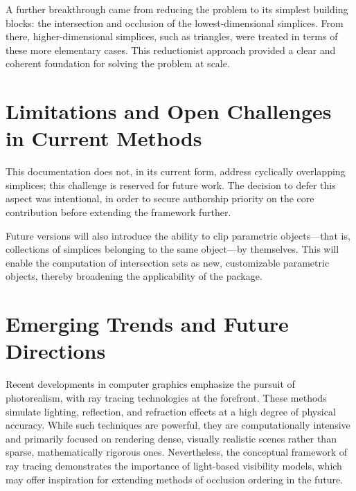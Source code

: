A further breakthrough came from reducing the problem to its 
simplest building blocks: the intersection and occlusion of the 
lowest-dimensional simplices. From there, higher-dimensional 
simplices, such as triangles, were treated in terms of these more 
elementary cases. This reductionist approach provided a clear and 
coherent foundation for solving the problem at scale.

\section{Limitations and Open Challenges in Current Methods}

This documentation does not, in its current form, address cyclically 
overlapping simplices; this challenge is reserved for future work. 
The decision to defer this aspect was intentional, in order to 
secure authorship priority on the core contribution before extending 
the framework further. 

Future versions will also introduce the ability to clip parametric 
objects---that is, collections of simplices belonging to the same 
object---by themselves. This will enable the computation of 
intersection sets as new, customizable parametric objects, thereby 
broadening the applicability of the package.

\section{Emerging Trends and Future Directions}

Recent developments in computer graphics emphasize the pursuit of 
photorealism, with ray tracing technologies at the forefront. These 
methods simulate lighting, reflection, and refraction effects at a 
high degree of physical accuracy. While such techniques are powerful, 
they are computationally intensive and primarily focused on rendering 
dense, visually realistic scenes rather than sparse, mathematically 
rigorous ones. Nevertheless, the conceptual framework of ray tracing 
demonstrates the importance of light-based visibility models, which 
may offer inspiration for extending methods of occlusion ordering in 
the future.

